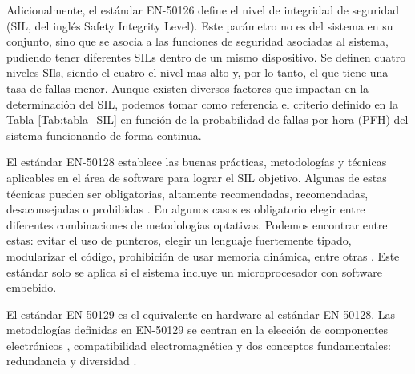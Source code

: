     Adicionalmente, el estándar EN-50126 define el nivel de integridad de seguridad (SIL, del inglés Safety Integrity Level). Este parámetro no es del sistema en su conjunto, sino que se asocia a las funciones de seguridad asociadas al sistema, pudiendo tener diferentes SILs dentro de un mismo dispositivo. Se definen cuatro niveles SIls, siendo el cuatro el nivel mas alto y, por lo tanto, el que tiene una tasa de fallas menor. Aunque existen diversos factores que impactan en la determinación del SIL, podemos tomar como referencia el criterio definido en la Tabla \ref{Tab:tabla_SIL} en función de la probabilidad de fallas por hora (PFH) del sistema funcionando de forma continua.

    \begin{table}[H]
        {
        \caption{SIL en función de la Probabilidad de Fallas/Hora (PFH).}
        \label{Tab:tabla_SIL}
        \centering
            \begin{center}
            \end{center}
        }    
    \end{table}

    El estándar EN-50128 establece las buenas prácticas, metodologías y técnicas aplicables en el área de software para lograr el SIL objetivo. Algunas de estas técnicas pueden ser obligatorias, altamente recomendadas, recomendadas, desaconsejadas o prohibidas \cite{Paper_75,Paper_15,Paper_21,Paper_54,Paper_65}. En algunos casos es obligatorio elegir entre diferentes combinaciones de metodologías optativas. Podemos encontrar entre estas: evitar el uso de punteros, elegir un lenguaje fuertemente tipado, modularizar el código, prohibición de usar memoria dinámica, entre otras \cite{Paper_75}. Este estándar solo se aplica si el sistema incluye un microprocesador con software embebido.

    El estándar EN-50129 es el equivalente en hardware al estándar EN-50128. Las metodologías definidas en EN-50129 se centran en la elección de componentes electrónicos \cite{Paper_68,Paper_116,Paper_117,Paper_120,Paper_122,Paper_126}, compatibilidad electromagnética y dos conceptos fundamentales: redundancia \cite{Paper_23,Paper_29,Paper_32,Paper_42,Paper_49,Paper_97,Paper_98} y diversidad \cite{Paper_53,Paper_125,Paper_131,Paper_132,Paper_140,Paper_171}.

    